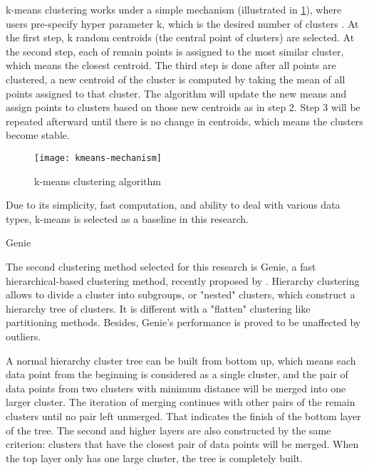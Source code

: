 \documentclass[a4paper,man,floatsintext,natbib,noextraspace]{apa6}
\makeatletter
\renewcommand{\subsubsection}{\@startsection{subsubsection}{3}
  {\z@}
  {\b@level@two@skip}
  {\e@level@two@skip}
  {\normalfont\normalsize\bfseries\itshape}}
\makeatother
\begin{document}
k-means clustering works under a simple mechanism (illustrated in \ref{fig:kmeans}), where users pre-specify hyper parameter k, which is the desired number of clusters \citep{hanDataMiningConcepts2012}. At the first step, k random centroids (the central point of clusters) are selected. At the second step, each of remain points is assigned to the most similar cluster, which means the closest centroid. The third step is done after all points are clustered, a new centroid of the cluster is computed by taking the mean of all points assigned to that cluster. The algorithm will update the new means and assign points to clusters based on those new centroids as in step 2. Step 3 will be repeated afterward until there is no change in centroids, which means the clusters become stable.

\begin{figure}[h!]
    \centering
    \captionsetup{justification=centering}
    \texttt{[image: kmeans-mechanism]}
    \caption{k-means clustering algorithm}\label{fig:kmeans}
\end{figure}  

Due to its simplicity, fast computation, and ability to deal with various data types, k-means is selected as a baseline in this research. 

\subsubsection{Genie}

The second clustering method selected for this research is Genie, a fast hierarchical-based clustering method, recently proposed by \cite{gagolewskiGenieNewFast2016a}. Hierarchy clustering allows to divide a cluster into subgroups, or "nested" clusters, which construct a hierarchy tree of clusters. It is different with a "flatten" clustering like partitioning methods. Besides, Genie’s performance is proved to be unaffected by outliers.

A normal hierarchy cluster tree can be built from bottom up, which means each data point from the beginning is considered as a single cluster, and the pair of data points from two clusters with minimum distance will be merged into one larger cluster. The iteration of merging continues with other pairs of the remain clusters until no pair left unmerged. That indicates the finish of the bottom layer of the tree. The second and higher layers are also constructed by the same criterion: clusters that have the closest pair of data points will be merged. When the top layer only has one large cluster, the tree is completely built. 
\end{document}

